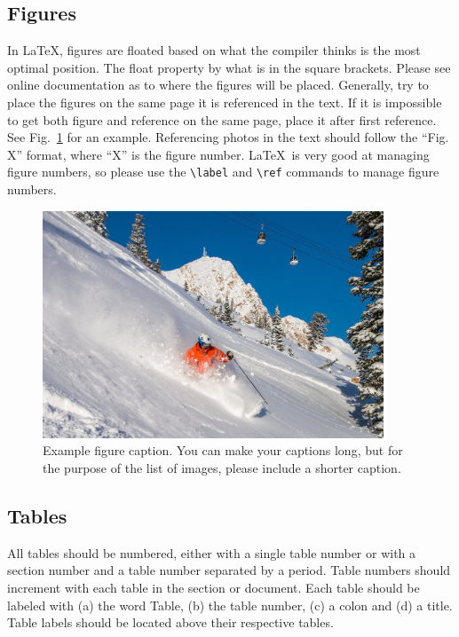 \subsection{Figures}
\label{sec:figures}

In \LaTeX, figures are floated based on what the compiler thinks is the most optimal position.  The float property by what is in the square brackets.  Please see online documentation as to where the figures will be placed.  Generally, try to place the figures on the same page it is referenced in the text.  If it is impossible to get both figure and reference on the same page, place it after first reference.  See Fig.~\ref{fig:snowbasinPhoto} for an example.  Referencing photos in the text should follow the ``Fig. X'' format, where ``X'' is the figure number.  \LaTeX\ is very good at managing figure numbers, so please use the \verb+\label+ and \verb+\ref+ commands to manage figure numbers.

\begin{figure}[h!]
  \centering
  \includegraphics[width=4in]{images/snowbasin.jpg}
  \caption[Example short caption]{Example figure caption.  You can make your captions long, but for the purpose of the list of images, please include a shorter caption.}
  \label{fig:snowbasinPhoto}
\end{figure}

\subsection{Tables}
\label{sec:tables}

All tables should be numbered, either with a single table number or with a section number and a table number separated by a period. Table numbers should increment with each table in the section or document. Each table should be labeled with (a) the word Table, (b) the table number, (c) a colon and (d) a title. Table labels should be located above their respective tables.

